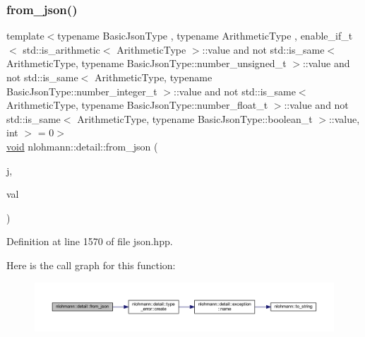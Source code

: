 \subsubsection{\texorpdfstring{from\_json()}{from\_json()}\hspace{0.1cm}{\footnotesize\ttfamily [14/18]}}
{\footnotesize\ttfamily template$<$typename Basic\+Json\+Type , typename Arithmetic\+Type , enable\+\_\+if\+\_\+t$<$ std\+::is\+\_\+arithmetic$<$ Arithmetic\+Type $>$\+::value and not std\+::is\+\_\+same$<$ Arithmetic\+Type, typename Basic\+Json\+Type\+::number\+\_\+unsigned\+\_\+t $>$\+::value and not std\+::is\+\_\+same$<$ Arithmetic\+Type, typename Basic\+Json\+Type\+::number\+\_\+integer\+\_\+t $>$\+::value and not std\+::is\+\_\+same$<$ Arithmetic\+Type, typename Basic\+Json\+Type\+::number\+\_\+float\+\_\+t $>$\+::value and not std\+::is\+\_\+same$<$ Arithmetic\+Type, typename Basic\+Json\+Type\+::boolean\+\_\+t $>$\+::value, int $>$  = 0$>$ \\
\mbox{\hyperlink{namespacenlohmann_1_1detail_a59fca69799f6b9e366710cb9043aa77d}{void}} nlohmann\+::detail\+::from\+\_\+json (\begin{DoxyParamCaption}\item[{const Basic\+Json\+Type \&}]{j,  }\item[{Arithmetic\+Type \&}]{val }\end{DoxyParamCaption})}



Definition at line 1570 of file json.\+hpp.

Here is the call graph for this function\+:
\nopagebreak
\begin{figure}[H]
\begin{center}
\leavevmode
\includegraphics[width=350pt]{namespacenlohmann_1_1detail_a839b0ab50d2c9bce669068f56bc41202_cgraph}
\end{center}
\end{figure}
\mbox{\label{namespacenlohmann_1_1detail_aae9f9c2601074e323d49428132cc293d}} 
